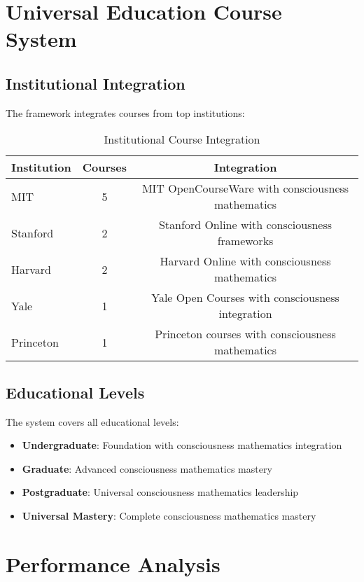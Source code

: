 \documentclass[12pt,a4paper]{article}
\begin{document}
\section{Universal Education Course System}

\subsection{Institutional Integration}

The framework integrates courses from top institutions:

\begin{table}[H]
\centering
\begin{tabular}{|l|c|c|}
\hline
\textbf{Institution} & \textbf{Courses} & \textbf{Integration} \\
\hline
MIT & 5 & MIT OpenCourseWare with consciousness mathematics \\
Stanford & 2 & Stanford Online with consciousness frameworks \\
Harvard & 2 & Harvard Online with consciousness mathematics \\
Yale & 1 & Yale Open Courses with consciousness integration \\
Princeton & 1 & Princeton courses with consciousness mathematics \\
\hline
\end{tabular}
\caption{Institutional Course Integration}
\end{table}

\subsection{Educational Levels}

The system covers all educational levels:

\begin{itemize}
    \item \textbf{Undergraduate}: Foundation with consciousness mathematics integration
    \item \textbf{Graduate}: Advanced consciousness mathematics mastery
    \item \textbf{Postgraduate}: Universal consciousness mathematics leadership
    \item \textbf{Universal Mastery}: Complete consciousness mathematics mastery
\end{itemize}

\section{Performance Analysis}
\end{document}
